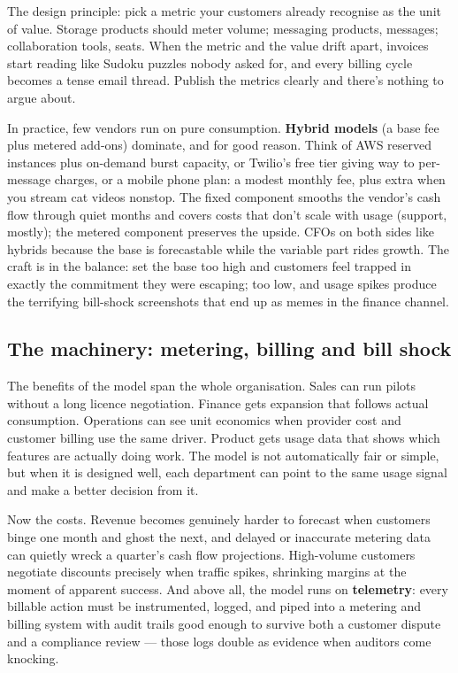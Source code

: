 The design principle: pick a metric your customers already recognise as the unit of value. Storage products should meter volume; messaging products, messages; collaboration tools, seats. When the metric and the value drift apart, invoices start reading like Sudoku puzzles nobody asked for, and every billing cycle becomes a tense email thread. Publish the metrics clearly and there's nothing to argue about.


In practice, few vendors run on pure consumption. \textbf{Hybrid models} (a base fee plus metered add-ons) dominate, and for good reason. Think of AWS reserved instances plus on-demand burst capacity, or Twilio's free tier giving way to per-message charges, or a mobile phone plan: a modest monthly fee, plus extra when you stream cat videos nonstop. The fixed component smooths the vendor's cash flow through quiet months and covers costs that don't scale with usage (support, mostly); the metered component preserves the upside. CFOs on both sides like hybrids because the base is forecastable while the variable part rides growth. The craft is in the balance: set the base too high and customers feel trapped in exactly the commitment they were escaping; too low, and usage spikes produce the terrifying bill-shock screenshots that end up as memes in the finance channel.



\subsection{The machinery: metering, billing and bill shock}


The benefits of the model span the whole organisation. Sales can run pilots without a long licence negotiation. Finance gets expansion that follows actual consumption. Operations can see unit economics when provider cost and customer billing use the same driver. Product gets usage data that shows which features are actually doing work. The model is not automatically fair or simple, but when it is designed well, each department can point to the same usage signal and make a better decision from it.


Now the costs. Revenue becomes genuinely harder to forecast when customers binge one month and ghost the next, and delayed or inaccurate metering data can quietly wreck a quarter's cash flow projections. High-volume customers negotiate discounts precisely when traffic spikes, shrinking margins at the moment of apparent success. And above all, the model runs on \textbf{telemetry}: every billable action must be instrumented, logged, and piped into a metering and billing system with audit trails good enough to survive both a customer dispute and a compliance review — those logs double as evidence when auditors come knocking.


